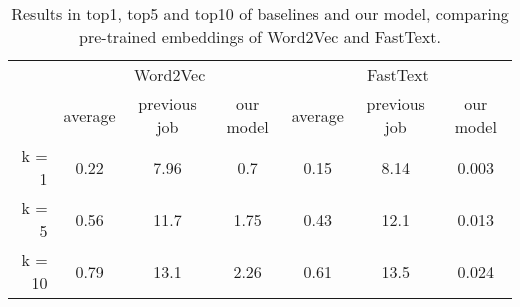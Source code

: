 \begin{table}[htbp]
\centering
\begin{tabular}{@{}rcccccc@{}}
\toprule
\multicolumn{1}{c}{} & \multicolumn{3}{c}{Word2Vec}       & \multicolumn{3}{c}{FastText}       \\ \cmidrule(l){2-7} 
\multicolumn{1}{c}{} & average & previous job & our model & average & previous job & our model \\ \cmidrule(l){2-7} 
k = 1                & 0.22    & 7.96         & 0.7       & 0.15    & 8.14         & 0.003     \\
k = 5                & 0.56    & 11.7         & 1.75      & 0.43    & 12.1         & 0.013     \\
k = 10               & 0.79    & 13.1         & 2.26      & 0.61    & 13.5         & 0.024     \\ 
\bottomrule
\end{tabular}
\centering

\caption{\centering Results in top1, top5 and top10 of baselines and our model, comparing pre-trained embeddings of Word2Vec and FastText.}
\label{tab:resTransJob}
\end{table}
